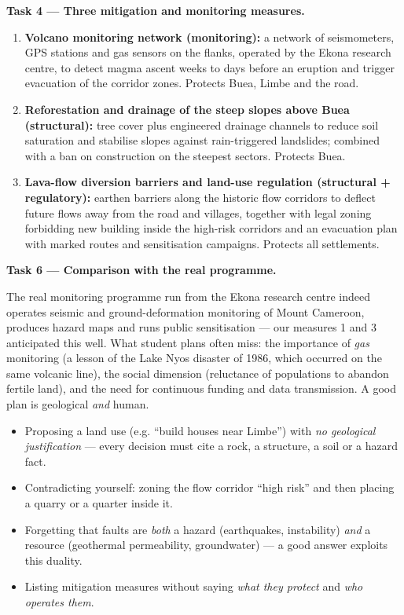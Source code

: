 \documentclass[11pt]{article}
\begin{document}
\textbf{Task 4 — Three mitigation and monitoring measures.}
\begin{enumerate}
\item \textbf{Volcano monitoring network (monitoring):} a network of seismometers, GPS stations and gas sensors on the flanks, operated by the Ekona research centre, to detect magma ascent weeks to days before an eruption and trigger evacuation of the corridor zones. Protects Buea, Limbe and the road.
\item \textbf{Reforestation and drainage of the steep slopes above Buea (structural):} tree cover plus engineered drainage channels to reduce soil saturation and stabilise slopes against rain-triggered landslides; combined with a ban on construction on the steepest sectors. Protects Buea.
\item \textbf{Lava-flow diversion barriers and land-use regulation (structural + regulatory):} earthen barriers along the historic flow corridors to deflect future flows away from the road and villages, together with legal zoning forbidding new building inside the high-risk corridors and an evacuation plan with marked routes and sensitisation campaigns. Protects all settlements.
\end{enumerate}

\textbf{Task 6 — Comparison with the real programme.}\par
The real monitoring programme run from the Ekona research centre indeed operates seismic and ground-deformation monitoring of Mount Cameroon, produces hazard maps and runs public sensitisation — our measures 1 and 3 anticipated this well. What student plans often miss: the importance of \emph{gas} monitoring (a lesson of the Lake Nyos disaster of 1986, which occurred on the same volcanic line), the social dimension (reluctance of populations to abandon fertile land), and the need for continuous funding and data transmission. A good plan is geological \emph{and} human.

\begin{attention}
\begin{itemize}
\item Proposing a land use (e.g. ``build houses near Limbe'') with \emph{no geological justification} — every decision must cite a rock, a structure, a soil or a hazard fact.
\item Contradicting yourself: zoning the flow corridor ``high risk'' and then placing a quarry or a quarter inside it.
\item Forgetting that faults are \emph{both} a hazard (earthquakes, instability) \emph{and} a resource (geothermal permeability, groundwater) — a good answer exploits this duality.
\item Listing mitigation measures without saying \emph{what they protect} and \emph{who operates them}.
\end{itemize}
\end{attention}
\end{document}
